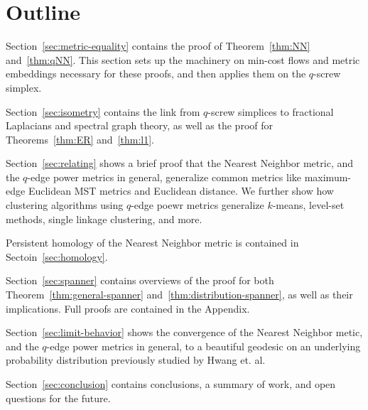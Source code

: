 \section{Outline}
%  
Section~\ref{sec:metric-equality} contains the proof of Theorem~\ref{thm:NN}
and~\ref{thm:qNN}. This section sets up the machinery on min-cost flows
and metric embeddings necessary for these proofs, and then applies them on
the $q$-screw simplex.

Section~\ref{sec:isometry} contains the link from $q$-screw simplices to
fractional Laplacians and spectral graph theory, as well as the proof for
Theorems~\ref{thm:ER} and~\ref{thm:l1}.

Section~\ref{sec:relating} shows a brief proof that the Nearest Neighbor
metric, and the $q$-edge power metrics in general, generalize common
metrics like maximum-edge Euclidean MST metrics and Euclidean distance. We
further show how clustering algorithms using $q$-edge poewr metrics
generalize $k$-means, level-set methods, single linkage clustering, and
more.

Persistent homology of the Nearest Neighbor metric is contained in
Sectoin~\ref{sec:homology}.

Section~\ref{sec:spanner} contains overviews of the proof for both
Theorem~\ref{thm:general-spanner} and~\ref{thm:distribution-spanner}, as
well as their implications. Full
proofs are contained in the Appendix.

Section~\ref{sec:limit-behavior} shows the convergence of the Nearest Neighbor
metic, and the $q$-edge power metrics in general, to a beautiful geodesic
on an underlying probability distribution previously studied by Hwang et.
al.

Section~\ref{sec:conclusion} contains conclusions, a summary of work, and
open questions for the future.
